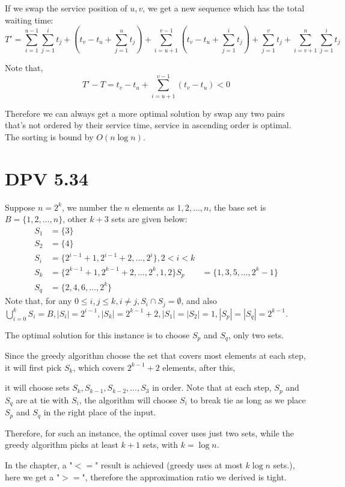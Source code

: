 \documentclass[twoside]{homework}
\begin{document}
If we swap the service position of $u, v$, we get a new sequence which has the total waiting time:
\[T' = \sum_{i=1}^{u-1}\sum_{j=1}^i t_j + (t_v - t_u + \sum_{j=1}^{u} t_j) + \sum_{i=u+1}^{v-1}(t_v - t_u+ \sum_{j=1}^i t_j) + \sum_{j=1}^v t_j + \sum_{i=v+1}^n\sum_{j=1}^i t_j\]

Note that,
\[T' - T = t_v - t_u + \sum_{i=u+1}^{v-1}(t_v - t_u) < 0\]

Therefore we can always get a more optimal solution by swap any two pairs that's not ordered by their service time, service in ascending order is optimal. The sorting is bound by $O(n\log n)$.

\section{DPV 5.34}
Suppose $n = 2^k$, we number the $n$ elements as $1, 2,...,n$, the base set is $B = \{1, 2, ...,n\}$, other $k+3$ sets are given below:
\begin{align*}
	S_1 &= \{3\} \\
	S_2 &= \{4\} \\
	S_i &= \{2^{i-1}+1, 2^{i-1}+2, ..., 2^i\} , 2 < i < k\\
	S_k &= \{2^{k-1}+1, 2^{k-1}+2, ..., 2^k, 1, 2\}
	S_p &= \{1, 3, 5, ..., 2^k-1\} \\
	S_q &= \{2, 4, 6, ..., 2^k\}
\end{align*}
Note that, for any $0 \leq i, j \leq k, i \neq j, S_i \cap S_j = \emptyset$, and also $\bigcup_{i=0}^k S_i = B, |S_i| = 2^{i-1}, |S_k| = 2^{k-1} + 2, |S_1| = |S_2| = 1, |S_p| = |S_q| = 2^{k-1}$.

The optimal solution for this instance is to choose $S_p$ and $S_q$, only two sets.

Since the greedy algorithm choose the set that covers most elements at each step, it will first pick $S_k$, which covers $2^{k-1} + 2$ elements, after this,

it will choose sets $S_k, S_{k-1}, S_{k-2}, ..., S_3$ in order. Note that at each step, $S_p$ and $S_q$ are at tie with $S_i$, the algorithm will choose $S_i$ to break tie as long as we place $S_p$ and $S_q$ in the right place of the input.

Therefore, for such an instance, the optimal cover uses just two sets, while the greedy algorithm picks at least $k+1$ sets, with $k = \log n$.

In the chapter, a "$<=$" result is achieved (greedy uses at most $k\log n$ sets.), here we get a "$>=$", therefore the approximation ratio we derived is tight.
\end{document}
